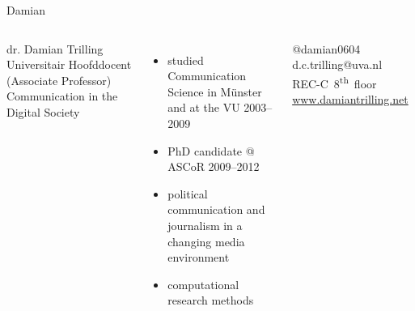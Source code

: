 \begin{frame}{Damian}
	
	\begin{columns}
		dr. Damian Trilling \\
		Universitair Hoofddocent (Associate Professor) Communication in the Digital Society \\
		\begin{itemize}
			\item studied Communication Science in M\"unster and at the VU 2003--2009
			\item PhD candidate @ ASCoR 2009--2012
			\item political communication and journalism in a changing media environment
			\item computational research methods
		\end{itemize}
		@damian0604 ~~ d.c.trilling@uva.nl ~~ REC-C~8\textsuperscript{th}~floor ~~ \url{www.damiantrilling.net} 
	\end{columns}
\end{frame}



